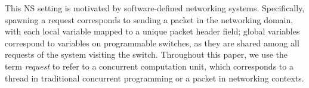 %
%
This NS setting is motivated by software-defined networking systems. Specifically, spawning a request corresponds to sending a packet in the networking domain, with each local variable mapped to a unique packet header field; global variables correspond to variables on programmable switches, as they are shared among all requests of the system visiting the switch. Throughout this paper, we use the term \emph{request} to refer to a concurrent computation unit, which corresponds to a thread in traditional concurrent programming or a packet in networking contexts. 
    
